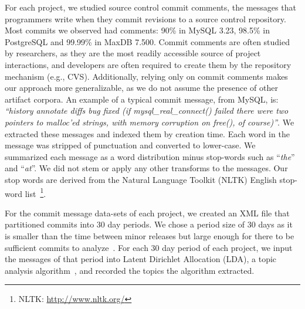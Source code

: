 \documentclass[smallextended]{svjour3}       %
\begin{document}
For each project, we studied source control commit comments, the messages
that programmers write when they commit revisions to a source control
repository. 
Most commits we observed had comments: 90\% in MySQL 3.23,
98.5\% in PostgreSQL and 99.99\% in MaxDB 7.500.
Commit comments are often studied by researchers, as they are the most readily accessible source of project interactions, and developers are often
required to create them by the repository mechanism (e.g., CVS).  Additionally, relying only on commit comments makes our approach more generalizable,
as we do not assume the presence of other artifact corpora.
An example of a typical commit message, from MySQL, is: \textit{``history annotate diffs bug fixed (if mysql\-\_real\-\_connect() failed there were
two pointers to malloc'ed strings, with memory corruption on free(), of course)''}. 
We extracted these messages and indexed them by creation time. 
Each word in the message was
stripped of punctuation and converted to lower-case.
We summarized each message as a word distribution minus stop-words
such as ``\emph{the}'' and ``\emph{at}''. We did not stem or apply any
other transforms to the messages.
Our stop words are derived from the Natural Language Toolkit (NLTK) English stop-word
list~\footnote{NLTK: \url{http://www.nltk.org/}}.


For the commit message data-sets of each project, we created an XML file that partitioned commits into 30 day periods. 
We chose a period size of 30 days as it is smaller than the time between minor releases but large enough for there to be sufficient commits to
analyze~\cite{Hindle09ICSM}. 
For each 30 day period of each project, we input the messages of that period into Latent Dirichlet Allocation (LDA), a topic analysis
algorithm~\cite{Blei2003}, and recorded the topics the algorithm extracted.
\end{document}
